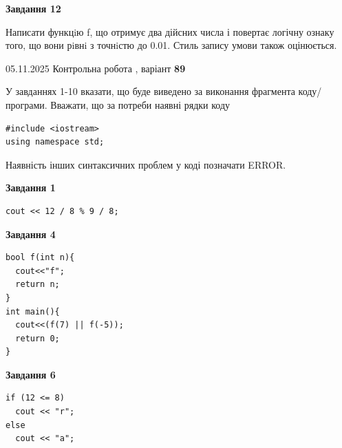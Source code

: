 \documentclass[12pt, ukrainian]{article}
\begin{document}
{\begin {large}
\begin{minipage}[t]{11.0cm}
\begin{center}
\textbf{Завдання 12}
\end{center}

Написати функцiю f, що отримує два дійсних числа і повертає логічну ознаку того, що вони рiвнi з точнiстю до 0.01. Стиль запису умови також оцінюється.\par

\end{minipage}

\end {large}}
\newpage

{\Large{05.11.2025 Контрольна робота , варіант  \No \textbf { 89 }\par}}
{
\begin {large}
У завданнях 1-10 вказати, що буде виведено за виконання фрагмента коду/про\-гра\-ми.
Вважати, що за потреби наявні рядки коду
\begin{verbatim}
#include <iostream>
using namespace std;
\end{verbatim}
Наявність інших синтаксичних проблем у коді позначати ERROR.

\begin{minipage}[t]{7.0cm}

\begin{center}
\textbf{Завдання 1}
\end{center}
\vspace{-8mm}

\begin{verbatim}
cout << 12 / 8 % 9 / 8;
\end{verbatim}



\begin{center}
\textbf{Завдання 4}
\end{center}
\vspace{-8mm}

\begin{verbatim}
bool f(int n){
  cout<<"f";
  return n;
}
int main(){
  cout<<(f(7) || f(-5));
  return 0;
}
\end{verbatim}



\begin{center}
\textbf{Завдання 6}
\end{center}
\vspace{-8mm}

\begin{verbatim}
if (12 <= 8)
  cout << "r";
else
  cout << "a";
\end{verbatim}




\end{minipage}
\end{large}}
\end{document}
